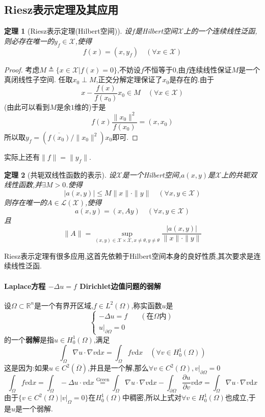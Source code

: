 \documentclass[12pt,a4paper]{article}
\newtheorem{thm}{定理}[subsection]  %
\begin{document}
\subsection{Riesz表示定理及其应用}
\begin{thm}[Riesz表示定理(Hilbert空间)]
    设$f$是\rm{Hilbert}空间$\mathscr{X}$上的一个连续线性泛函,则必存在唯一的$y_f \in \mathscr{X}$,使得
    \[f(x) = (x,y_f)\quad (\forall x \in \mathscr{X})\]
\end{thm}
\begin{proof}
    考虑$M\triangleq \{x\in \mathscr{X}|f(x) = 0\}$,不妨设$f$不恒等于$0$,由$f$连续线性保证$M$是一个真闭线性子空间.
    任取$x_0 \perp M$,正交分解定理保证了$x_0$是存在的.由于\[x-\frac{f(x)}{f(x_0)}x_0 \in M \quad (\forall x \in \mathscr{X})\]
    (由此可以看到$M$是余$1$维的)于是\[f(x)\frac{\|x_0\|^2}{f(x_0)} = (x,x_0)\]所以取$y_f = (\overline{f(x_0)}/\|x_0\|^2) x_0$即可.
\end{proof}
实际上还有$\|f\| = \|y_f\|$.
\begin{thm}[共轭双线性函数的表示]
    设$\mathscr{X}$是一个\rm{Hilbert}空间,$a(x,y)$是$\mathscr{X}$上的共轭双线性函数,并$\exists M>0$.使得
    \[|a(x,y)| \leq M\|x\|\cdot \|y\|\quad (\forall x,y \in \mathscr{X})\]
    则存在唯一的$A \in \mathscr{L}(\mathscr{X})$,使得\[a(x,y) = (x,Ay) \quad (\forall x,y \in \mathscr{X})\]
    且\[\|A\| = \underset{(x,y) \in \mathscr{X}\times \mathscr{X}, x \neq \theta, y \neq \theta}{\sup}\frac{|a(x,y)|}{\|x\|\cdot \|y\|} \]
\end{thm}
Riesz表示定理有很多应用,这首先依赖于\rm{Hilbert}空间本身的良好性质,其次要求是连续线性泛函.

\paragraph{Laplace方程 $-\Delta u = f$ Dirichlet边值问题的弱解}\mbox{} 

设$\Omega\subset \mathbb{R}^n$是一个有界开区域,$f\in L^2(\Omega)$,称实函数$u$是
\begin{equation}\begin{cases}
    -\Delta u = f &\quad (\text{在}\Omega \text{内})\\u|_{\partial \Omega} = 0&
\end{cases}\tag{\#} \end{equation}
的一个\textbf{弱解}是指$u \in H_0^1(\Omega)$,满足
\[\int_{\Omega} \nabla u \cdot \nabla v \mathrm{d}x = \int_{\Omega}fv\mathrm{d}x \quad (\forall v \in H_0^1(\Omega))\]
这是因为:如果$u \in C^2(\overline{\Omega})$,并且是一个解,那么$\forall v \in C^2(\Omega),v|_{\partial \Omega} = 0$
\[\int_{\Omega}fv\mathrm{d}x = \int_{\Omega}-\Delta u \cdot v\mathrm{d}x 
\overset{\mathrm{Green}}{=} \int_{\Omega}\nabla u \cdot \nabla v \mathrm{d}x - \int_{\partial \Omega} \frac{\partial u}{\partial v} v \mathrm{d}\sigma
= \int_{\Omega}\nabla u \cdot \nabla v \mathrm{d}x\]
由于$\{v \in C^2(\Omega)|v|_{\Omega} = 0\}$在$H_0^1(\Omega)$中稠密,所以上式对$\forall v\in H_0^1(\Omega)$也成立,于是$u$是一个弱解.
\end{document}
